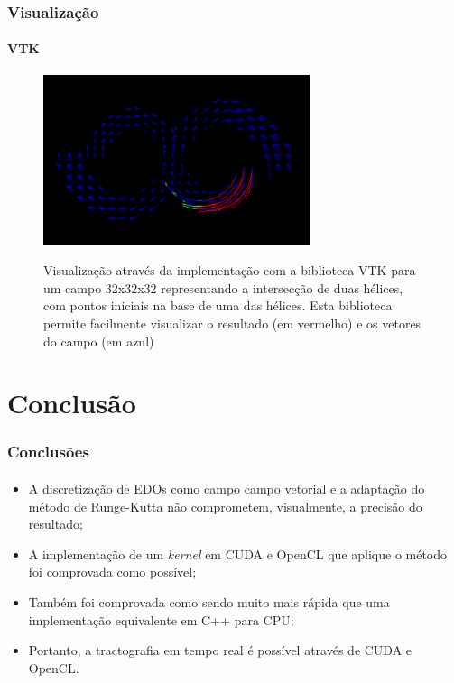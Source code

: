 \documentclass[brazil, 10pt]{beamer}
\begin{document}
\begin{frame}
  \frametitle{Visualização}
  \framesubtitle{VTK}
  \begin{figure}
    \begin{center}
      \includegraphics[width=78mm, height=50mm]{img/vtk.png}
      \label{fig:}
      \caption{Visualização através da implementação com a biblioteca VTK para um campo 32x32x32 representando a intersecção de duas hélices, com pontos iniciais na base de uma das hélices. Esta biblioteca permite facilmente visualizar o resultado (em vermelho) e os vetores do campo (em azul)}
    \end{center}
  \end{figure}
\end{frame}

\section{Conclusão}
\begin{frame}
  \frametitle{Conclusões}
  \framesubtitle{}

  \begin{itemize}
    \item A discretização de EDOs como campo campo vetorial e a adaptação do método de Runge-Kutta não comprometem, visualmente, a precisão do resultado;
    \item A implementação de um \textit{kernel} em CUDA e OpenCL que aplique o método foi comprovada como possível;
    \item Também foi comprovada como sendo muito mais rápida que uma implementação equivalente em C++ para CPU;
    \item Portanto, a tractografia em tempo real é possível através de CUDA e OpenCL.
  \end{itemize}
\end{frame}
\end{document}
